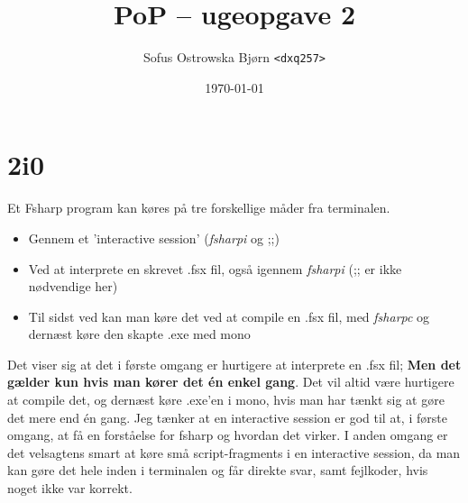 \documentclass[12pt,a4paper]{article}
\title{PoP -- ugeopgave 2}
\author {Sofus Ostrowska Bjørn \texttt{<dxq257>}}
\date{\today}
\begin{document}
\maketitle

\section*{2i0}
Et Fsharp program kan køres på tre forskellige måder fra terminalen.   
\begin{itemize}
    \item Gennem et 'interactive session' (\textit{fsharpi} og ;;)
    \item Ved at interprete en  skrevet .fsx fil, også igennem\textit{ fsharpi} (;; er ikke nødvendige her)
    \item Til sidst ved kan man køre det ved at compile en .fsx fil, med \textit{fsharpc} og dernæst køre den skapte .exe med mono
\end{itemize}
Det viser sig at det i første omgang er hurtigere at interprete en .fsx fil; \textbf{Men det gælder kun hvis man kører det én enkel gang}. Det vil altid være hurtigere at compile det, og dernæst køre .exe'en i mono, hvis man har tænkt sig at gøre det mere end én gang.
Jeg tænker at en interactive session er god til at, i første omgang, at få en forståelse for fsharp og hvordan det virker. I anden omgang er det velsagtens smart at køre små script-fragments i en interactive session, da man kan gøre det hele inden i terminalen og får direkte svar, samt fejlkoder, hvis noget ikke var korrekt.
\end{document}
